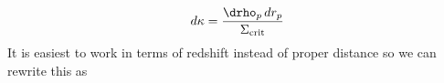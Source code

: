 \begin{equation}
\label{eqn:dkappa}
  d\kappa = \frac{\drho_p\,dr_p}{\Sigma_{\rm crit}}
 \end{equation}
It is easiest to work in terms of redshift instead of proper distance so we can rewrite this as
  
  